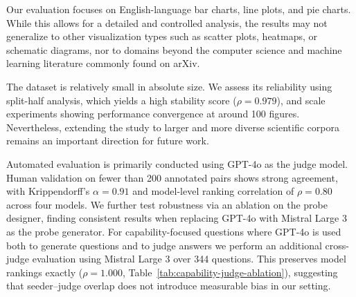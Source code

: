


Our evaluation focuses on English-language bar charts, line plots, and pie charts. While this allows for a detailed and controlled analysis, the results may not generalize to other visualization types such as scatter plots, heatmaps, or schematic diagrams, nor to domains beyond the computer science and machine learning literature commonly found on arXiv.

The dataset is relatively small in absolute size. We assess its reliability using split-half analysis, which yields a high stability score ($\rho = 0.979$), and scale experiments showing performance convergence at around 100 figures. Nevertheless, extending the study to larger and more diverse scientific corpora remains an important direction for future work.

Automated evaluation is primarily conducted using GPT-4o as the judge model. Human validation on fewer than 200 annotated pairs shows strong agreement, with Krippendorff’s $\alpha = 0.91$ and model-level ranking correlation of $\rho = 0.80$ across four models. We further test robustness via an ablation on the probe designer, finding consistent results when replacing GPT-4o with Mistral Large 3 as the probe generator. For capability-focused questions where GPT-4o is used both to generate questions and to judge answers we perform an additional cross-judge evaluation using Mistral Large 3 over 344 questions. This preserves model rankings exactly ($\rho = 1.000$, Table~\ref{tab:capability-judge-ablation}), suggesting that seeder–judge overlap does not introduce measurable bias in our setting.

